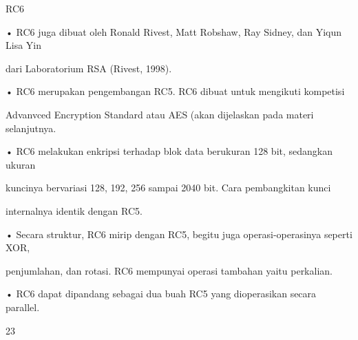 \documentclass{article}
\begin{document}

RC6

• RC6 juga dibuat oleh Ronald Rivest, Matt Robshaw, Ray Sidney, dan Yiqun Lisa Yin 

dari Laboratorium RSA (Rivest, 1998). 

• RC6 merupakan pengembangan RC5. RC6 dibuat untuk mengikuti kompetisi 

Advanvced Encryption Standard  atau AES (akan dijelaskan pada materi selanjutnya.

• RC6 melakukan enkripsi terhadap blok data berukuran 128 bit, sedangkan ukuran 

kuncinya bervariasi 128, 192, 256 sampai 2040 bit. Cara pembangkitan kunci 

internalnya identik dengan RC5. 

• Secara struktur, RC6 mirip dengan RC5, begitu juga operasi-operasinya seperti XOR, 

penjumlahan, dan rotasi.  RC6 mempunyai operasi tambahan yaitu perkalian. 

• RC6 dapat dipandang sebagai dua buah RC5 yang dioperasikan secara parallel.

23
\end{document}
